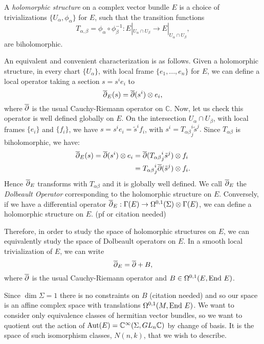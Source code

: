 	\begin{definition}
		A \textit{holomorphic structure} on a complex vector bundle $E$ is a choice of trivializations $\{U_\alpha, \phi_\alpha\}$ for $E$, such that the transition functions
		\begin{equation*}
		T_{\alpha,\beta} = \phi_\alpha \circ \phi^{-1}_\beta: E|_{U_\alpha \cap U_\beta} \to E|_{U_\alpha \cap U_\beta},
		\end{equation*}
		are biholomorphic. 
	\end{definition}
	An equivalent and convenient characterization is as follows. Given a holomorphic structure, in every chart $\{U_\alpha\}$, with local frame $\{e_1,...,e_n\}$ for $E$, we can define a local operator taking a section $s = s^i e_i$ to
	\begin{equation*}
	\overline{\partial}_E(s) = \overline{\partial}(s^i)\otimes e_i,
	\end{equation*}
	where $\overline{\partial}$ is the usual Cauchy-Riemann operator on $\mathbb{C}$. Now, let us check this operator is well defined globally on $E$. On the intersection $U_\alpha \cap U_\beta$, with local frames $\{e_i\}$ and $\{f_i\}$, we have $s = s^i e_i = \tilde{s}^i f_i$, with $s^i = {T_{\alpha\beta}}^i_j\tilde{s}^j.$ Since $T_{\alpha\beta}$ is biholomorphic, we have:
	\begin{align*}
	\overline{\partial}_E(s) = \overline{\partial}(s^i)\otimes e_i &= \overline{\partial}({T_{\alpha\beta}}^i_j \tilde{s}^j)\otimes f_i\\
	&= {T_{\alpha\beta}}^i_j \overline{\partial}(\tilde{s}^j)\otimes f_i.
	\end{align*}
	Hence $\overline{\partial}_E$ transforms with $T_{\alpha\beta}$ and it is globally well defined. We call $\overline{\partial}_E$ the \textit{Dolbeault Operator} corresponding to the holomorphic structure on $E$. Conversely, if we have a differential operator $\overline{\partial}_E:\Gamma(E) \to \Omega^{0,1}(\Sigma)\otimes \Gamma(E)$, we can define a holomorphic structure on $E$. (pf or citation needed)
	
	Therefore, in order to study the space of holomorphic structures on $E$, we can equivalently study the space of Dolbeault operators on $E$. In a smooth local trivialization of $E$, we can write 
	\begin{equation*}
	\overline{\partial}_E = \overline{\partial} + B,
	\end{equation*}
	where $\overline{\partial}$ is the usual Cauchy-Riemann operator and $B \in \Omega^{0,1}(E, \text{End } E)$.
	
	Since $\dim \Sigma = 1$ there is no constraints on $B$ (citation needed) and so our space is an affine complex space with translations $\Omega^{0,1}(M,\text{End } E)$. We want to consider only equivalence classes of hermitian vector bundles, so we want to quotient out the action of $\text{Aut}(E) = \mathbb{C}^\infty(\Sigma, GL_n\mathbb{C})$ by change of basis. It is the space of such isomorphism classes, $N(n,k)$, that we wish to describe. 
	
